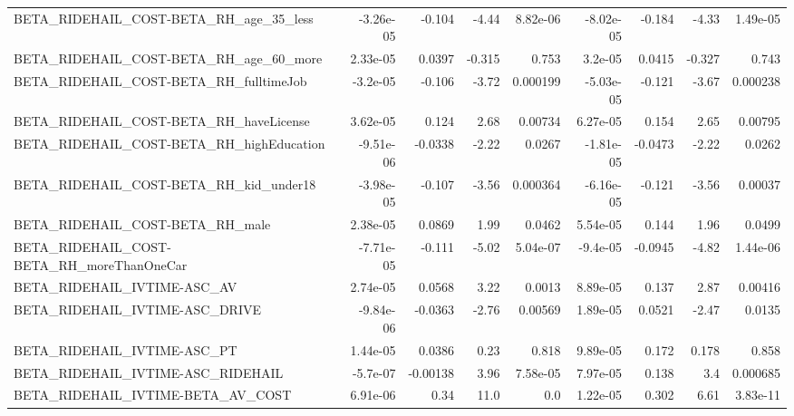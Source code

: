 \begin{tabular}{lrrrrrrrr}
BETA\_RIDEHAIL\_COST-BETA\_RH\_age\_35\_less             &   -3.26e-05 &       -0.104 &     -4.44 & 8.82e-06 &  -8.02e-05 &      -0.184 &        -4.33 &      1.49e-05 \\
BETA\_RIDEHAIL\_COST-BETA\_RH\_age\_60\_more             &    2.33e-05 &       0.0397 &    -0.315 &    0.753 &    3.2e-05 &      0.0415 &       -0.327 &         0.743 \\
BETA\_RIDEHAIL\_COST-BETA\_RH\_fulltimeJob             &    -3.2e-05 &       -0.106 &     -3.72 & 0.000199 &  -5.03e-05 &      -0.121 &        -3.67 &      0.000238 \\
BETA\_RIDEHAIL\_COST-BETA\_RH\_haveLicense             &    3.62e-05 &        0.124 &      2.68 &  0.00734 &   6.27e-05 &       0.154 &         2.65 &       0.00795 \\
BETA\_RIDEHAIL\_COST-BETA\_RH\_highEducation           &   -9.51e-06 &      -0.0338 &     -2.22 &   0.0267 &  -1.81e-05 &     -0.0473 &        -2.22 &        0.0262 \\
BETA\_RIDEHAIL\_COST-BETA\_RH\_kid\_under18             &   -3.98e-05 &       -0.107 &     -3.56 & 0.000364 &  -6.16e-05 &      -0.121 &        -3.56 &       0.00037 \\
BETA\_RIDEHAIL\_COST-BETA\_RH\_male                    &    2.38e-05 &       0.0869 &      1.99 &   0.0462 &   5.54e-05 &       0.144 &         1.96 &        0.0499 \\
BETA\_RIDEHAIL\_COST-BETA\_RH\_moreThanOneCar          &   -7.71e-05 &       -0.111 &     -5.02 & 5.04e-07 &   -9.4e-05 &     -0.0945 &        -4.82 &      1.44e-06 \\
BETA\_RIDEHAIL\_IVTIME-ASC\_AV                        &    2.74e-05 &       0.0568 &      3.22 &   0.0013 &   8.89e-05 &       0.137 &         2.87 &       0.00416 \\
BETA\_RIDEHAIL\_IVTIME-ASC\_DRIVE                     &   -9.84e-06 &      -0.0363 &     -2.76 &  0.00569 &   1.89e-05 &      0.0521 &        -2.47 &        0.0135 \\
BETA\_RIDEHAIL\_IVTIME-ASC\_PT                        &    1.44e-05 &       0.0386 &      0.23 &    0.818 &   9.89e-05 &       0.172 &        0.178 &         0.858 \\
BETA\_RIDEHAIL\_IVTIME-ASC\_RIDEHAIL                  &    -5.7e-07 &     -0.00138 &      3.96 & 7.58e-05 &   7.97e-05 &       0.138 &          3.4 &      0.000685 \\
BETA\_RIDEHAIL\_IVTIME-BETA\_AV\_COST                  &    6.91e-06 &         0.34 &      11.0 &      0.0 &   1.22e-05 &       0.302 &         6.61 &      3.83e-11 \\

\end{tabular}
